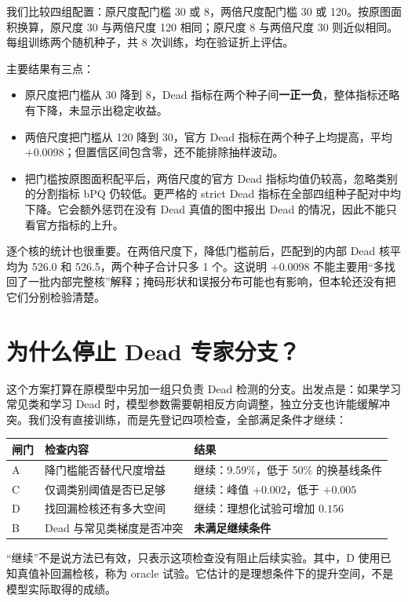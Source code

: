 \documentclass[12pt,a4paper]{article}
\begin{document}
我们比较四组配置：原尺度配门槛 30 或 8，两倍尺度配门槛 30 或 120。按原图面积换算，原尺度 30 与两倍尺度 120 相同；原尺度 8 与两倍尺度 30 则近似相同。每组训练两个随机种子，共 8 次训练，均在验证折上评估。

主要结果有三点：
\begin{itemize}
\item 原尺度把门槛从 30 降到 8，Dead 指标在两个种子间\textbf{一正一负}，整体指标还略有下降，未显示出稳定收益。
\item 两倍尺度把门槛从 120 降到 30，官方 Dead 指标在两个种子上均提高，平均 $+0.0098$；但置信区间包含零，还不能排除抽样波动。
\item 把门槛按原图面积配平后，两倍尺度的官方 Dead 指标均值仍较高，忽略类别的分割指标 bPQ 仍较低。更严格的 strict Dead 指标在全部四组种子配对中均下降。它会额外惩罚在没有 Dead 真值的图中报出 Dead 的情况，因此不能只看官方指标的上升。
\end{itemize}

逐个核的统计也很重要。在两倍尺度下，降低门槛前后，匹配到的内部 Dead 核平均为 526.0 和 526.5，两个种子合计只多 1 个。这说明 $+0.0098$ 不能主要用“多找回了一批内部完整核”解释；掩码形状和误报分布可能也有影响，但本轮还没有把它们分别检验清楚。

\section*{为什么停止 Dead 专家分支？}

这个方案打算在原模型中另加一组只负责 Dead 检测的分支。出发点是：如果学习常见类和学习 Dead 时，模型参数需要朝相反方向调整，独立分支也许能缓解冲突。我们没有直接训练，而是先登记四项检查，全部满足条件才继续：

\begin{center}
\begin{tabular}{lll}\toprule
闸门 & 检查内容 & 结果\\\midrule
A & 降门槛能否替代尺度增益 & 继续：9.59\%，低于 50\% 的换基线条件\\
C & 仅调类别阈值是否已足够 & 继续：峰值 $+0.002$，低于 $+0.005$\\
D & 找回漏检核还有多大空间 & 继续：理想化试验可增加 $0.156$\\
B & Dead 与常见类梯度是否冲突 & \textbf{未满足继续条件}\\\bottomrule
\end{tabular}
\end{center}

“继续”不是说方法已有效，只表示这项检查没有阻止后续实验。其中，D 使用已知真值补回漏检核，称为 oracle 试验。它估计的是理想条件下的提升空间，不是模型实际取得的成绩。
\end{document}

